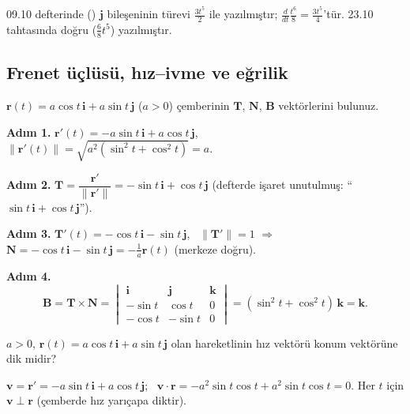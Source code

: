 \begin{dikkat}
09.10 defterinde () $\mathbf j$ bileşeninin türevi $\frac{3t^5}{2}$ ile yazılmıştır;
$\frac{d}{dt}\frac{t^6}{8}=\frac{3t^5}{4}$'tür. 23.10 tahtasında doğru ($\frac68t^5$) yazılmıştır.
\end{dikkat}

\subsection{Frenet üçlüsü, hız--ivme ve eğrilik}

\begin{soru}
$\mathbf r(t)=a\cos t\,\mathbf i+a\sin t\,\mathbf j$ ($a>0$) çemberinin $\mathbf T$, $\mathbf N$, $\mathbf B$ vektörlerini bulunuz.
\end{soru}
\begin{cevap}
\textbf{Adım 1.} $\mathbf r'(t)=-a\sin t\,\mathbf i+a\cos t\,\mathbf j$, \ $\|\mathbf r'(t)\|=\sqrt{a^2(\sin^2t+\cos^2t)}=a$.

\textbf{Adım 2.} $\mathbf T=\dfrac{\mathbf r'}{\|\mathbf r'\|}=-\sin t\,\mathbf i+\cos t\,\mathbf j$ (defterde işaret unutulmuş: ``$\sin t\,\mathbf i+\cos t\,\mathbf j$'').

\textbf{Adım 3.} $\mathbf T'(t)=-\cos t\,\mathbf i-\sin t\,\mathbf j$, \ $\|\mathbf T'\|=1$ $\Rightarrow$ $\mathbf N=-\cos t\,\mathbf i-\sin t\,\mathbf j=-\frac1a\mathbf r(t)$ (merkeze doğru).

\textbf{Adım 4.}
\[ \mathbf B=\mathbf T\times\mathbf N=\begin{vmatrix}\mathbf i&\mathbf j&\mathbf k\\-\sin t&\cos t&0\\-\cos t&-\sin t&0\end{vmatrix}=(\sin^2t+\cos^2t)\,\mathbf k=\mathbf k . \]
\end{cevap}

\begin{soru}
$a>0$, $\mathbf r(t)=a\cos t\,\mathbf i+a\sin t\,\mathbf j$ olan hareketlinin hız vektörü konum vektörüne dik midir?
\end{soru}
\begin{cevap}
$\mathbf v=\mathbf r'=-a\sin t\,\mathbf i+a\cos t\,\mathbf j$; \ $\mathbf v\cdot\mathbf r=-a^2\sin t\cos t+a^2\sin t\cos t=0$.
Her $t$ için $\mathbf v\perp\mathbf r$ (çemberde hız yarıçapa diktir).
\end{cevap}

